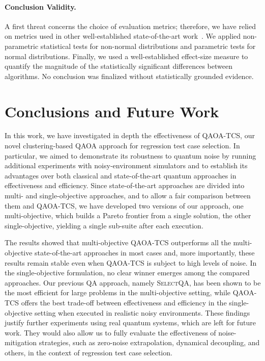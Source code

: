 \paragraph{Conclusion Validity.}  
A first threat concerns the choice of evaluation metrics; therefore, we have relied on metrics used in other well-established state-of-the-art work~\citep{selectqa,panichella2014improving,bootqa,igdec_qaoa}.
We applied non-parametric statistical tests for non-normal distributions and parametric tests for normal distributions. Finally, we used a well-established effect-size measure to quantify the magnitude of the statistically significant differences between algorithms. No conclusion was finalized without statistically grounded evidence.

\section{Conclusions and Future Work}
\label{sec:6}

In this work, we have investigated in depth the effectiveness of \textsc{QAOA-TCS}, our novel clustering-based QAOA approach for regression test case selection. In particular, we aimed to demonstrate its robustness to quantum noise by running additional experiments with noisy-environment simulators and to establish its advantages over both classical and state-of-the-art quantum approaches in effectiveness and efficiency.
Since state-of-the-art approaches are divided into multi- and single-objective approaches, and to allow a fair comparison between them and \textsc{QAOA-TCS}, we have developed two versions of our approach, one multi-objective, which builds a Pareto frontier from a single solution, the other single-objective, yielding a single sub-suite after each execution.

The results showed that multi-objective \textsc{QAOA-TCS} outperforms all the multi-objective state-of-the-art approaches in most cases and, more importantly, these results remain stable even when \textsc{QAOA-TCS} is subject to high levels of noise. In the single-objective formulation, no clear winner emerges among the compared approaches. Our previous QA approach, namely \textsc{SelectQA}, has been shown to be the most efficient for large problems in the multi-objective setting, while \textsc{QAOA-TCS} offers the best trade-off between effectiveness and efficiency in the single-objective setting when executed in realistic noisy environments. These findings justify further experiments using real quantum systems, which are left for future work. They would also allow us to fully evaluate the effectiveness of noise-mitigation strategies, such as zero-noise extrapolation, dynamical decoupling, and others, in the context of regression test case selection.

